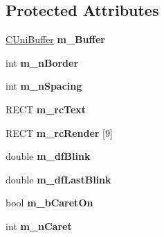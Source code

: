 \subsection*{Protected Attributes}
\begin{DoxyCompactItemize}
\item 
\hypertarget{class_c_d_x_u_t_edit_box_afb55f6d88b6d994cf61227f7afb5f719}{\hyperlink{class_c_uni_buffer}{C\+Uni\+Buffer} {\bfseries m\+\_\+\+Buffer}}\label{class_c_d_x_u_t_edit_box_afb55f6d88b6d994cf61227f7afb5f719}

\item 
\hypertarget{class_c_d_x_u_t_edit_box_ae4930c5e75aab5ff2b367ac9acdac18f}{int {\bfseries m\+\_\+n\+Border}}\label{class_c_d_x_u_t_edit_box_ae4930c5e75aab5ff2b367ac9acdac18f}

\item 
\hypertarget{class_c_d_x_u_t_edit_box_a7d9ac282370b9a8f67994cc4a82df00e}{int {\bfseries m\+\_\+n\+Spacing}}\label{class_c_d_x_u_t_edit_box_a7d9ac282370b9a8f67994cc4a82df00e}

\item 
\hypertarget{class_c_d_x_u_t_edit_box_a3ccb7a43b360576571463ae1f38ec111}{R\+E\+C\+T {\bfseries m\+\_\+rc\+Text}}\label{class_c_d_x_u_t_edit_box_a3ccb7a43b360576571463ae1f38ec111}

\item 
\hypertarget{class_c_d_x_u_t_edit_box_ab65b28d8d4846c70ab893c2117047750}{R\+E\+C\+T {\bfseries m\+\_\+rc\+Render} \mbox{[}9\mbox{]}}\label{class_c_d_x_u_t_edit_box_ab65b28d8d4846c70ab893c2117047750}

\item 
\hypertarget{class_c_d_x_u_t_edit_box_a487954472ae7688f22aaf01f719a4114}{double {\bfseries m\+\_\+df\+Blink}}\label{class_c_d_x_u_t_edit_box_a487954472ae7688f22aaf01f719a4114}

\item 
\hypertarget{class_c_d_x_u_t_edit_box_aea2dc193c118915719b7905896e1ed3f}{double {\bfseries m\+\_\+df\+Last\+Blink}}\label{class_c_d_x_u_t_edit_box_aea2dc193c118915719b7905896e1ed3f}

\item 
\hypertarget{class_c_d_x_u_t_edit_box_a2a7a67ef2c2104a2d62a00517915f59b}{bool {\bfseries m\+\_\+b\+Caret\+On}}\label{class_c_d_x_u_t_edit_box_a2a7a67ef2c2104a2d62a00517915f59b}

\item 
\hypertarget{class_c_d_x_u_t_edit_box_a148a39c11d4b189d2bbf37e45e74d6d6}{int {\bfseries m\+\_\+n\+Caret}}\label{class_c_d_x_u_t_edit_box_a148a39c11d4b189d2bbf37e45e74d6d6}


\end{DoxyCompactItemize}
